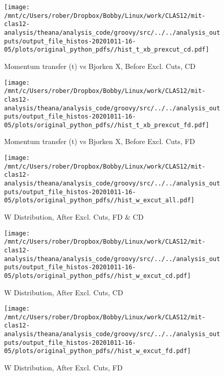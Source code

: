 \documentclass{article}
\begin{document}
\begin{landscape}
    \begin{figure}[h]
        \centering

        \texttt{[image: /mnt/c/Users/rober/Dropbox/Bobby/Linux/work/CLAS12/mit-clas12-analysis/theana/analysis\_code/groovy/src/../../analysis\_outputs/output\_file\_histos-20201011-16-05/plots/original\_python\_pdfs//hist\_t\_xb\_prexcut\_cd.pdf]}
        \captionsetup{textformat=empty,labelformat=blank}
        \caption{Momentum transfer (t) vs Bjorken X, Before Excl. Cuts, CD}
    \end{figure}
    \clearpage
    
    \begin{figure}[h]
        \centering

        \texttt{[image: /mnt/c/Users/rober/Dropbox/Bobby/Linux/work/CLAS12/mit-clas12-analysis/theana/analysis\_code/groovy/src/../../analysis\_outputs/output\_file\_histos-20201011-16-05/plots/original\_python\_pdfs//hist\_t\_xb\_prexcut\_fd.pdf]}
        \captionsetup{textformat=empty,labelformat=blank}
        \caption{Momentum transfer (t) vs Bjorken X, Before Excl. Cuts, FD}
    \end{figure}
    \clearpage
    
    \begin{figure}[h]
        \centering

        \texttt{[image: /mnt/c/Users/rober/Dropbox/Bobby/Linux/work/CLAS12/mit-clas12-analysis/theana/analysis\_code/groovy/src/../../analysis\_outputs/output\_file\_histos-20201011-16-05/plots/original\_python\_pdfs//hist\_w\_excut\_all.pdf]}
        \captionsetup{textformat=empty,labelformat=blank}
        \caption{W Distribution, After Excl. Cuts, FD \& CD}
    \end{figure}
    \clearpage
    
    \begin{figure}[h]
        \centering

        \texttt{[image: /mnt/c/Users/rober/Dropbox/Bobby/Linux/work/CLAS12/mit-clas12-analysis/theana/analysis\_code/groovy/src/../../analysis\_outputs/output\_file\_histos-20201011-16-05/plots/original\_python\_pdfs//hist\_w\_excut\_cd.pdf]}
        \captionsetup{textformat=empty,labelformat=blank}
        \caption{W Distribution, After Excl. Cuts, CD}
    \end{figure}
    \clearpage
    
    \begin{figure}[h]
        \centering

        \texttt{[image: /mnt/c/Users/rober/Dropbox/Bobby/Linux/work/CLAS12/mit-clas12-analysis/theana/analysis\_code/groovy/src/../../analysis\_outputs/output\_file\_histos-20201011-16-05/plots/original\_python\_pdfs//hist\_w\_excut\_fd.pdf]}
        \captionsetup{textformat=empty,labelformat=blank}
        \caption{W Distribution, After Excl. Cuts, FD}
    \end{figure}
    \clearpage
    

\end{landscape}
\end{document}
